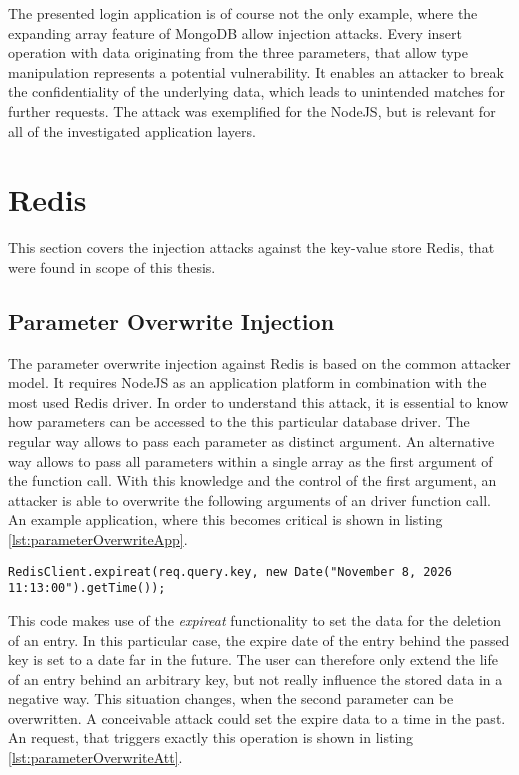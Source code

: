 The presented login application is of course not the only example, where the expanding array feature of MongoDB allow injection attacks. Every insert operation with data originating from the three parameters, that allow type manipulation represents a potential vulnerability. It enables an attacker to break the confidentiality of the underlying data, which leads to unintended matches for further requests. The attack was exemplified for the NodeJS, but is relevant for all of the investigated application layers. \\

\section{Redis}
This section covers the injection attacks against the key-value store Redis, that were found in scope of this thesis.

\subsection{Parameter Overwrite Injection}
The parameter overwrite injection against Redis is based on the common attacker model. It requires NodeJS as an application platform in combination with the most used Redis driver. In order to understand this attack, it is essential to know how parameters can be accessed to the this particular database driver. The regular way allows to pass each parameter as distinct argument. An alternative way allows to pass all parameters within a single array as the first argument of the function call. With this knowledge and the control of the first argument, an attacker is able to overwrite the following arguments of an driver function call. An example application, where this becomes critical is shown in listing \ref{lst:parameterOverwriteApp}. \\

\begin{lstlisting}[caption={Vulnerable NodeJS example for parameter overwrite injection on Redis}, label={lst:parameterOverwriteApp}]
RedisClient.expireat(req.query.key, new Date("November 8, 2026 11:13:00").getTime());
\end{lstlisting}

This code makes use of the \emph{expireat} functionality to set the data for the deletion of an entry. In this particular case, the expire date of the entry behind the passed key is set to a date far in the future. The user can therefore only extend the life of an entry behind an arbitrary key, but not really influence the stored data in a negative way. This situation changes, when the second parameter can be overwritten. A conceivable attack could set the expire data to a time in the past. An request, that triggers exactly this operation is shown in listing \ref{lst:parameterOverwriteAtt}. \\

